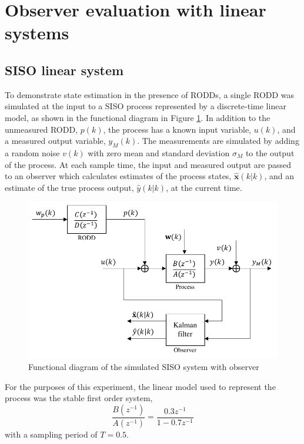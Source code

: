 \section{Observer evaluation with linear systems} \label{section:sim-obs-lin}

\subsection{SISO linear system} \label{sim-obs-lin-1}

To demonstrate state estimation in the presence of RODDs, a single RODD was simulated at the input to a SISO process represented by a discrete-time linear model, as shown in the functional diagram in Figure \ref{fig:sim-sys-diag-siso}. In addition to the unmeasured RODD, $p(k)$, the process has a known input variable, $u(k)$, and a measured output variable, $y_M(k)$. The measurements are simulated by adding a random noise $v(k)$ with zero mean and standard deviation $\sigma_M$ to the output of the process. At each sample time, the input and measured output are passed to an observer which calculates estimates of the process states, $\hat{\mathbf{x}}(k|k)$, and an estimate of the true process output, $\hat{y}(k|k)$, at the current time.
\begin{figure}[htp]
	\centering
	\includegraphics[width=11.5cm]{images/sim-sys-diag-siso.pdf}
	\caption{Functional diagram of the simulated SISO system with observer}
	\label{fig:sim-sys-diag-siso}
\end{figure}

For the purposes of this experiment, the linear model used to represent the process was the stable first order system,
\begin{equation}
	\frac{B(z^{-1})}{A(z^{-1})} = \frac{0.3z^{-1}}{1-0.7z^{-1}}
\end{equation}
with a sampling period of $T=0.5$.

